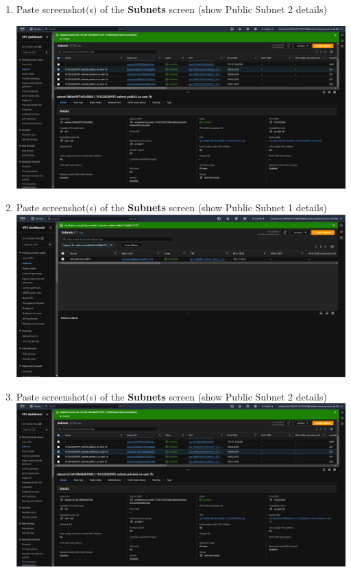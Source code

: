 \documentclass[11pt]{article}
\begin{document}
\begin{enumerate}
    \item Paste screenshot$($s$)$ of the \textbf{Subnets} screen (show Public Subnet 2 details) \\
    \vspace{5mm}


    {\centering
    \includegraphics[width=5.8in]{pics/5.png}
    }


    \item Paste screenshot$($s$)$ of the \textbf{Subnets} screen (show Public Subnet 1 details) \\
    
    {\centering
    \includegraphics[width=5.8in]{pics/6.png}
    }



    \item Paste screenshot$($s$)$ of the \textbf{Subnets} screen (show Public Subnet 2 details) \\

    {\centering
    \includegraphics[width=5.8in]{pics/7.png}
    }


\end{enumerate}
\end{document}
